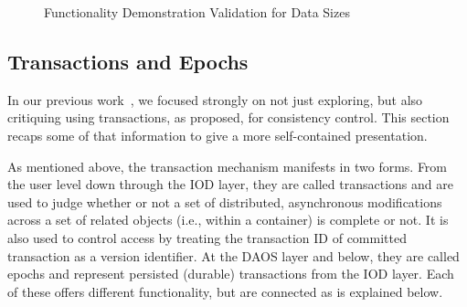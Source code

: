 \documentclass[conference]{IEEEtran} \pdfpagewidth=8.5in
\begin{document}
\begin{figure}[htbp!]
\centering
\vspace{-0.10in}
\vspace{-0.10in}
\caption{Functionality Demonstration Validation for Data Sizes}
\label{fig:eval-size}
\vspace{-0.2in}
\end{figure}

\subsection{Transactions and Epochs}
\label{sec:transactions}

In our previous work~\cite{lofstead:2014:ffsio-consistency}, we focused
strongly on not just exploring, but also critiquing using transactions, as
proposed, for consistency control. This section recaps some of that information
to give a more self-contained presentation.

As mentioned above, the transaction mechanism manifests in two forms. From the
user level down through the IOD layer, they are called transactions and are
used to judge whether or not a set of distributed, asynchronous modifications
across a set of related objects (i.e., within a container) is complete or not.
It is also used to control access by treating the transaction ID of committed
transaction as a version identifier.  At the DAOS layer and below, they are
called epochs and represent persisted (durable) transactions from the IOD
layer. Each of these offers different functionality, but are connected as is
explained below.
\end{document}
